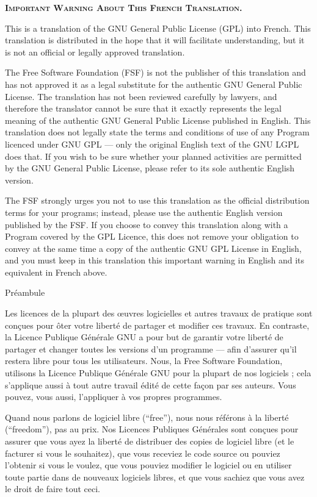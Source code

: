 {\begin{center}
\textsc{\textbf{Important Warning About This French Translation.}}
\end{center}

This is a translation of the GNU General Public License (GPL) into
French. This translation is distributed in the hope that it will
facilitate understanding, but it is not an official or legally approved
translation.

The Free Software Foundation (FSF) is not the publisher of this
translation and has not approved it as a legal substitute for the
authentic GNU General Public License. The translation has not been
reviewed carefully by lawyers, and therefore the translator cannot be
sure that it exactly represents the legal meaning of the authentic GNU
General Public License published in English. This translation does not
legally state the terms and conditions of use of any Program licenced
under GNU GPL — only the original English text of the GNU LGPL does
that. If you wish to be sure whether your planned activities are
permitted by the GNU General Public License, please refer to its sole
authentic English version.

The FSF strongly urges you not to use this translation as the official
distribution terms for your programs; instead, please use the authentic
English version published by the FSF. If you choose to convey this
translation along with a Program covered by the GPL Licence, this does
not remove your obligation to convey at the same time a copy of the
authentic GNU GPL License in English, and you must keep in this
translation this important warning in English and its equivalent in
French above.
\begin{center}
			    Préambule
\end{center}

  Les licences de la plupart des œuvres logicielles et autres travaux de
pratique sont conçues pour ôter votre liberté de partager et modifier
ces travaux. En contraste, la Licence Publique Générale GNU a pour but
de garantir votre liberté de partager et changer toutes les versions
d’un programme — afin d’assurer qu’il restera libre pour tous les
utilisateurs. Nous, la Free Software Foundation, utilisons la Licence
Publique Générale GNU pour la plupart de nos logiciels ; cela
s’applique aussi à tout autre travail édité de cette façon par ses
auteurs. Vous pouvez, vous aussi, l’appliquer à vos propres programmes.

  Quand nous parlons de logiciel libre (“free”), nous nous référons à la
liberté (“freedom”), pas au prix. Nos Licences Publiques Générales sont
conçues pour assurer que vous ayez la liberté de distribuer des copies
de logiciel libre (et le facturer si vous le souhaitez), que vous
receviez le code source ou pouviez l’obtenir si vous le voulez, que
vous pouviez modifier le logiciel ou en utiliser toute partie dans de
nouveaux logiciels libres, et que vous sachiez que vous avez le droit
de faire tout ceci.

}

